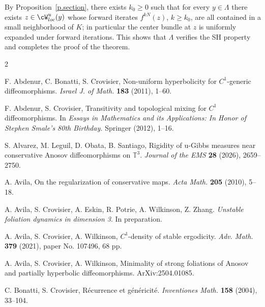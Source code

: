 \documentclass[a4paper,11pt]{amsart}
\numberwithin{equation}{section}     %
\theoremstyle{definition}
\theoremstyle{remark}
\begin{document}
By Proposition~\ref{p.section}, there exists $k_0\geq 0$ such that for every $y\in \Lambda$ there exists
$z\in \cW^u_{loc}(y)$ whose forward iterates $f^{kN}(z)$, $k\geq k_0$, are all contained in a small neighborhood of $K$; in particular the center bundle at $z$ is uniformly expanded under forward iterations.
This shows that $\Lambda$ verifies the SH property and completes the proof of the theorem.


\begin{thebibliography}{2}


 F. Abdenur, C. Bonatti, S. Crovisier,  Non-uniform hyperbolicity for $C^1$-generic diffeomorphisms. \emph{Israel J. of Math.} {\bf 183} (2011), 1--60.

 F. Abdenur, S. Crovisier,  Transitivity and topological mixing for $C^1$ diffeomorphisms.
In \emph{Essays in Mathematics and its Applications: In Honor of Stephen Smale's 80th Birthday.} Springer (2012), 1--16.

 S. Alvarez, M. Leguil, D. Obata, B. Santiago, Rigidity of u-Gibbs measures near conservative Anosov diffeomorphisms on $\mathbb{T}^3$. \emph{Journal of the EMS} \textbf{28} (2026), 2659--2750.

 A. Avila, On the regularization of conservative maps. \emph{Acta Math.}  \textbf{205} (2010), 5--18. 

 A. Avila, S. Crovisier, A. Eskin, R. Potrie, A. Wilkinson, Z. Zhang.
\emph{Unstable foliation dynamics in dimension 3}. In preparation.

 A. Avila, S. Crovisier, A. Wilkinson, $C^1$-density of stable ergodicity. \emph{Adv. Math.} {\bf 379} (2021), paper No. 107496, 68 pp.

 A. Avila, S. Crovisier, A. Wilkinson, Minimality of strong foliations of Anosov and partially hyperbolic diffeomorphisms. ArXiv:2504.01085.


 C. Bonatti, S. Crovisier, R\'ecurrence et g\'en\'ericit\'e. \emph{Inventiones Math.} {\bf 158} (2004), 33--104.


\end{thebibliography}
\end{document}
